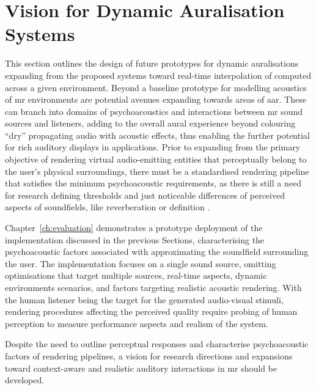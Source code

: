 \section{Vision for Dynamic Auralisation Systems}
This section outlines the design of future prototypes for dynamic auralisations expanding from the proposed systems toward real-time interpolation of  computed across a given environment. 
Beyond a baseline prototype for modelling acoustics of \acrshort{mr} environments are potential avenues expanding towards areas of \acrshort{aar}. These can branch into domains of psychoacoustics and interactions between \acrshort{mr} sound sources and listeners, adding to the overall aural experience beyond colouring ``dry'' propagating audio with acoustic effects, thus enabling the further potential for rich auditory displays in applications. Prior to expanding from the primary objective of rendering virtual audio-emitting entities that perceptually belong to the user's physical surroundings, there must be a standardised rendering pipeline that satisfies the minimum psychoacoustic requirements, as there is still a need for research defining thresholds and just noticeable differences of perceived aspects of soundfields, like reverberation or definition \citep{yang2022audio}.\par
Chapter~\ref{ch:evaluation} demonstrates a prototype deployment of the implementation discussed in the previous Sections, characterising the psychoacoustic factors associated with approximating the soundfield surrounding the user. The implementation focuses on a single sound source, omitting optimisations that target multiple sources, real-time aspects, dynamic environments scenarios, and factors targeting realistic acoustic rendering. With the human listener being the target for the generated audio-visual stimuli, rendering procedures affecting the perceived quality require probing of human perception to measure performance aspects and realism of the system. \par
Despite the need to outline perceptual responses and characterise psychoacoustic factors of rendering pipelines, a vision for research directions and expansions toward context-aware and realistic auditory interactions in \acrshort{mr} should be developed.




